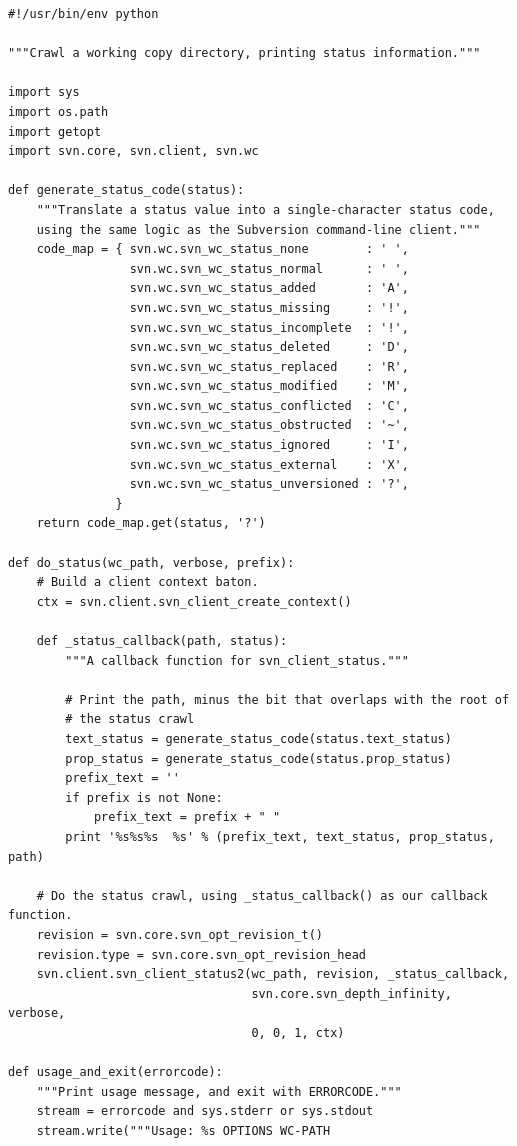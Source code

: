 \begin{verbatim}
#!/usr/bin/env python

"""Crawl a working copy directory, printing status information."""

import sys
import os.path
import getopt
import svn.core, svn.client, svn.wc

def generate_status_code(status):
    """Translate a status value into a single-character status code,
    using the same logic as the Subversion command-line client."""
    code_map = { svn.wc.svn_wc_status_none        : ' ',
                 svn.wc.svn_wc_status_normal      : ' ',
                 svn.wc.svn_wc_status_added       : 'A',
                 svn.wc.svn_wc_status_missing     : '!',
                 svn.wc.svn_wc_status_incomplete  : '!',
                 svn.wc.svn_wc_status_deleted     : 'D',
                 svn.wc.svn_wc_status_replaced    : 'R',
                 svn.wc.svn_wc_status_modified    : 'M',
                 svn.wc.svn_wc_status_conflicted  : 'C',
                 svn.wc.svn_wc_status_obstructed  : '~',
                 svn.wc.svn_wc_status_ignored     : 'I',
                 svn.wc.svn_wc_status_external    : 'X',
                 svn.wc.svn_wc_status_unversioned : '?',
               }
    return code_map.get(status, '?')

def do_status(wc_path, verbose, prefix):
    # Build a client context baton.
    ctx = svn.client.svn_client_create_context()

    def _status_callback(path, status):
        """A callback function for svn_client_status."""

        # Print the path, minus the bit that overlaps with the root of
        # the status crawl
        text_status = generate_status_code(status.text_status)
        prop_status = generate_status_code(status.prop_status)
        prefix_text = ''
        if prefix is not None:
            prefix_text = prefix + " "
        print '%s%s%s  %s' % (prefix_text, text_status, prop_status, path)
        
    # Do the status crawl, using _status_callback() as our callback function.
    revision = svn.core.svn_opt_revision_t()
    revision.type = svn.core.svn_opt_revision_head
    svn.client.svn_client_status2(wc_path, revision, _status_callback,
                                  svn.core.svn_depth_infinity, verbose,
                                  0, 0, 1, ctx)

def usage_and_exit(errorcode):
    """Print usage message, and exit with ERRORCODE."""
    stream = errorcode and sys.stderr or sys.stdout
    stream.write("""Usage: %s OPTIONS WC-PATH


\end{verbatim}
